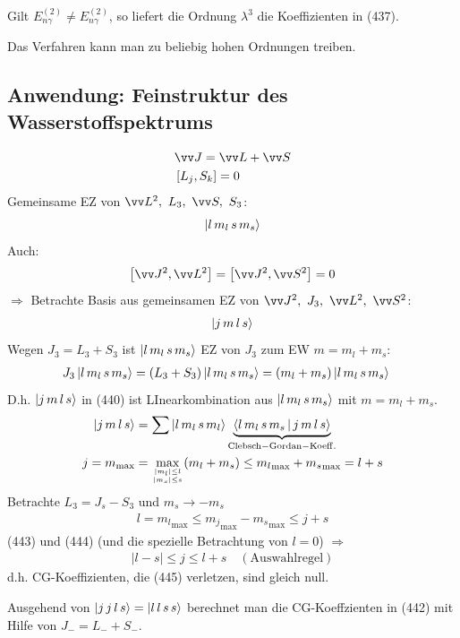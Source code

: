 \documentclass[a4paper]{scrartcl}
\newcommand{\eqn}[1]{\begin{align} #1 \end{align}}
\begin{document}
Gilt $E_{n \gamma}^{(2)} \neq E_{n \gamma}^{(2)}$, so liefert die Ordnung $\lambda^3$ die Koeffizienten in (437).

Das Verfahren kann man zu beliebig hohen Ordnungen treiben.

\subsection{Anwendung: Feinstruktur des Wasserstoffspektrums}

\setcounter{equation}{287}
\eqn{
& \vv J = \vv L + \vv S \\
& \left[ L_j, S_k \right] = 0
}
\setcounter{equation}{438}
Gemeinsame EZ von $\vv L^2, \ L_3, \  \vv S, \ S_3$:
\eqn{ \Ket{ l \, m_l \, s \, m_s}}
Auch:
$$\left[ \vv J^2 , \vv L^2 \right] = \left[ \vv J^2, \vv S^2 \right] = 0$$
$\Longrightarrow$ Betrachte Basis aus gemeinsamen EZ von $\vv J^2, \ J_3, \ \vv L^2, \ \vv S^2$:
\eqn{ \Ket{ j \, m \, l \, s }}
Wegen $J_3 = L_3 + S_3$ ist $\Ket{ l \, m_l \, s \, m_s}$ EZ von $J_3$ zum EW $m=m_l + m_s$:
\eqn{J_3 \Ket{ l \, m_l \, s \, m_s } & = (L_3 + S_3) \Ket{ l\,m_l\, s\,m_s} = (m_l + m_s) \Ket{ l \, m_l\, s \, m_s}}
D.h. $\Ket{ j \, m \, l \, s}$ in (440) ist LInearkombination aus $\Ket{ l \, m_l \, s \, m_s}$ mit $m = m_l + m_s$.
\eqn{ \Ket{ j \, m \, l \, s} & = \sum \Ket{ l \, m_l \, s \, m_l } \underbrace{ \Braket{ l \, m_l \, s \, m_s | j \, m \, l \, s }}_{\mathrm{Clebsch-Gordan-Koeff.}} \\
j=m_{\mathrm{max}}&  = \max_{\vert m_l \vert \leq l \atop \vert m_s \vert \leq s } (m_l + m_s) \leq {m_{l}}_{\mathrm{max}} + {m_s}_{\mathrm{max}} = l +s }
Betrachte $L_3 = J_s - S_3$ und $m_s \rightarrow -m_s$
\eqn{ l = {m_l}_\mathrm{max} \leq {m_j}_\mathrm{max} - {m_s}_\mathrm{max} \leq j + s}
(443) und (444) (und die spezielle Betrachtung von $l=0$) $\Longrightarrow$
\eqn{ \vert l - s\vert \leq j \leq l +s \quad \mathrm{(Auswahlregel)}}
d.h. CG-Koeffizienten, die (445) verletzen, sind gleich null.

Ausgehend von $\Ket{ j \, j \, l \, s} = \Ket{ l \, l \, s \, s}$ berechnet man die CG-Koeffzienten in (442) mit Hilfe von $J_- = L_- + S_-$.
\end{document}
